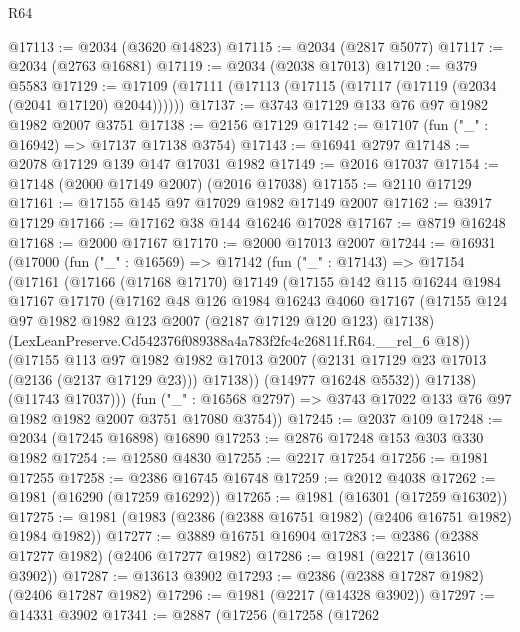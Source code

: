 \begin{lexlean}{R64}
\begin{coremodule}
@17113 := @2034 (@3620 @14823)
@17115 := @2034 (@2817 @5077)
@17117 := @2034 (@2763 @16881)
@17119 := @2034 (@2038 @17013)
@17120 := @379 @5583
@17129 := @17109 (@17111 (@17113 (@17115 (@17117 (@17119 (@2034 (@2041 @17120) @2044))))))
@17137 := @3743 @17129 @133 @76 @97 @1982 @1982 @2007 @3751
@17138 := @2156 @17129
@17142 := @17107 (fun ("_" : @16942) => @17137 @17138 @3754)
@17143 := @16941 @2797
@17148 := @2078 @17129 @139 @147 @17031 @1982
@17149 := @2016 @17037
@17154 := @17148 (@2000 @17149 @2007) (@2016 @17038)
@17155 := @2110 @17129
@17161 := @17155 @145 @97 @17029 @1982 @17149 @2007
@17162 := @3917 @17129
@17166 := @17162 @38 @144 @16246 @17028
@17167 := @8719 @16248
@17168 := @2000 @17167
@17170 := @2000 @17013 @2007
@17244 := @16931
    (@17000
      (fun ("_" : @16569) =>
      @17142
        (fun ("_" : @17143) =>
        @17154
          (@17161
            (@17166
              (@17168 @17170)
              @17149
              (@17155
                @142
                @115
                @16244
                @1984
                @17167
                @17170
                (@17162
                  @48
                  @126
                  @1984
                  @16243
                  @4060
                  @17167
                  (@17155 @124 @97 @1982 @1982 @123 @2007 (@2187 @17129 @120 @123) @17138)
                  (LexLeanPreserve.Cd542376f089388a4a783f2fc4c26811f.R64.__rel_6 @18))
                (@17155
                  @113
                  @97
                  @1982
                  @1982
                  @17013
                  @2007
                  (@2131 @17129 @23 @17013 (@2136 (@2137 @17129 @23)))
                  @17138))
              (@14977 @16248 @5532))
            @17138)
          (@11743 @17037)))
      (fun ("_" : @16568 @2797) => @3743 @17022 @133 @76 @97 @1982 @1982 @2007 @3751 @17080 @3754))
@17245 := @2037 @109
@17248 := @2034 (@17245 @16898) @16890
@17253 := @2876 @17248 @153 @303 @330 @1982
@17254 := @12580 @4830
@17255 := @2217 @17254
@17256 := @1981 @17255
@17258 := @2386 @16745 @16748
@17259 := @2012 @4038
@17262 := @1981 (@16290 (@17259 @16292))
@17265 := @1981 (@16301 (@17259 @16302))
@17275 := @1981 (@1983 (@2386 (@2388 @16751 @1982) (@2406 @16751 @1982) @1984 @1982))
@17277 := @3889 @16751 @16904
@17283 := @2386 (@2388 @17277 @1982) (@2406 @17277 @1982)
@17286 := @1981 (@2217 (@13610 @3902))
@17287 := @13613 @3902
@17293 := @2386 (@2388 @17287 @1982) (@2406 @17287 @1982)
@17296 := @1981 (@2217 (@14328 @3902))
@17297 := @14331 @3902
@17341 := @2887
    (@17256
      (@17258
        (@17262

\end{coremodule}
\end{lexlean}
